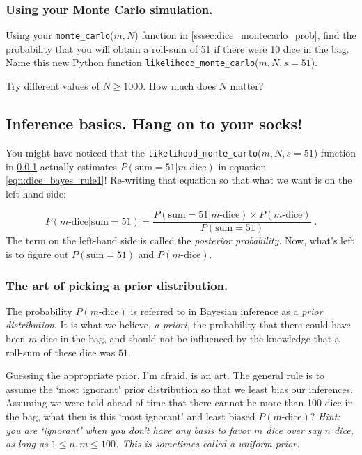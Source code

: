 \documentclass[11pt, oneside]{article}   	%
\begin{document}
\subsubsection{Using your Monte Carlo simulation.}\label{sssec:dice_montecarlo_infer1}
Using your {\tt monte\_carlo}($m, N$) function in \ref{sssec:dice_montecarlo_prob}, find the probability that you will obtain a roll-sum of 51 if there were 10 dice in the bag. Name this new Python function {\tt likelihood\_monte\_carlo}($m, N,s=51$).

Try different values of $N \geq 1000$. How much does $N$ matter?

\subsection{Inference basics. Hang on to your socks!} 
You might have noticed that the {\tt likelihood\_monte\_carlo}($m, N,s=51$) function in \ref{sssec:dice_montecarlo_infer1} actually estimates $P(\text{sum}=51|m\text{-dice})$ in equation \eqref{eqn:dice_bayes_rule1}! Re-writing that equation so that what we want is on the left hand side:

\begin{equation}
P(m \text{-dice}| \text{sum}=51) = \frac{ P(\text{sum}=51| m\text{-dice})  \times P(m\text{-dice})}{P(\text{sum}=51) }\;. \label{eqn:dice_bayes_rule2}
\end{equation}
The term on the left-hand side is called the {\it posterior probability}. Now, what's left is to figure out $P(\text{sum}=51)$ and $P(m\text{-dice})$.

\subsubsection{The art of picking a prior distribution.}\label{sssec:dice_picking_a_prior_distribution}
The probability $P(m\text{-dice})$ is referred to in Bayesian inference as a {\it prior distribution}. It is what we believe, {\it a priori}, the probability that there could have been $m$ dice in the bag, and should not be influenced by the knowledge that a roll-sum of these dice was $51$. 

Guessing the appropriate prior, I'm afraid, is an art. The general rule is to assume the `most ignorant' prior distribution so that we least bias our inferences. Assuming we were told ahead of time that there cannot be more than 100 dice in the bag, what then is this `most ignorant' and least biased $P(m\text{-dice})$? {\it Hint: you are `ignorant' when you don't have any basis to favor $m$ dice over say $n$ dice, as long as $1\leq n,m \leq 100$. This is sometimes called a uniform prior. }
 
\end{document}
